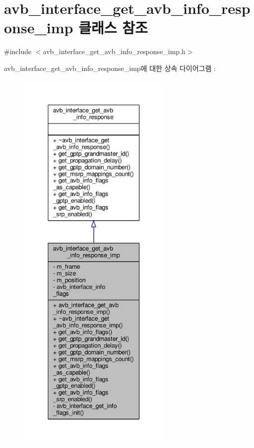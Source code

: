 \hypertarget{classavdecc__lib_1_1avb__interface__get__avb__info__response__imp}{}\section{avb\+\_\+interface\+\_\+get\+\_\+avb\+\_\+info\+\_\+response\+\_\+imp 클래스 참조}
\label{classavdecc__lib_1_1avb__interface__get__avb__info__response__imp}


{\ttfamily \#include $<$avb\+\_\+interface\+\_\+get\+\_\+avb\+\_\+info\+\_\+response\+\_\+imp.\+h$>$}



avb\+\_\+interface\+\_\+get\+\_\+avb\+\_\+info\+\_\+response\+\_\+imp에 대한 상속 다이어그램 \+: 
\nopagebreak
\begin{figure}[H]
\begin{center}
\leavevmode
\includegraphics[height=550pt]{classavdecc__lib_1_1avb__interface__get__avb__info__response__imp__inherit__graph}
\end{center}
\end{figure}


